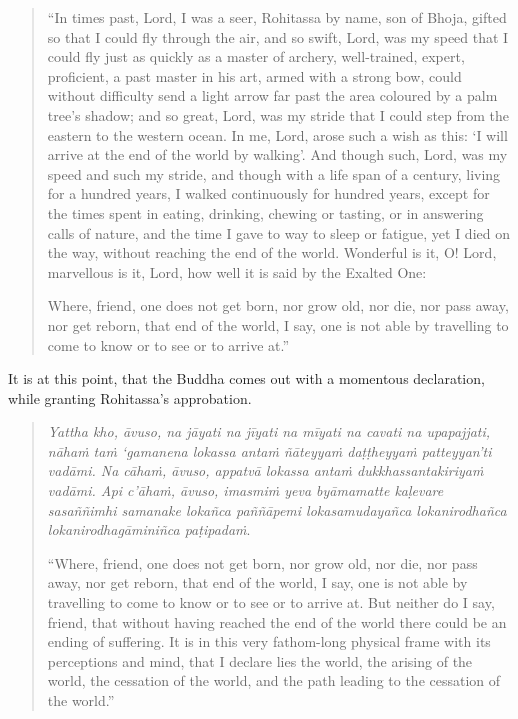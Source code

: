 \begin{quote}
``In times past, Lord, I was a seer, Rohitassa by name, son of Bhoja, gifted so that I could fly through the air, and so swift, Lord, was my speed that I could fly just as quickly as a master of archery, well-trained, expert, proficient, a past master in his art, armed with a strong bow, could without difficulty send a light arrow far past the area coloured by a palm tree's shadow; and so great, Lord, was my stride that I could step from the eastern to the western ocean. In me, Lord, arose such a wish as this: `I will arrive at the end of the world by walking'. And though such, Lord, was my speed and such my stride, and though with a life span of a century, living for a hundred years, I walked continuously for hundred years, except for the times spent in eating, drinking, chewing or tasting, or in answering calls of nature, and the time I gave to way to sleep or fatigue, yet I died on the way, without reaching the end of the world. Wonderful is it, O! Lord, marvellous is it, Lord, how well it is said by the Exalted One:

Where, friend, one does not get born, nor grow old, nor die, nor pass away, nor get reborn, that end of the world, I say, one is not able by travelling to come to know or to see or to arrive at.''
\end{quote}

It is at this point, that the Buddha comes out with a momentous declaration, while granting Rohitassa's approbation.

\begin{quote}
\emph{Yattha kho, āvuso, na jāyati na jīyati na mīyati na cavati na upapajjati, nāhaṁ taṁ `gamanena lokassa antaṁ ñāteyyaṁ daṭṭheyyaṁ patteyyan'ti vadāmi. Na cāhaṁ, āvuso, appatvā lokassa antaṁ dukkhassantakiriyaṁ vadāmi. Api c'āhaṁ, āvuso, imasmiṁ yeva byāmamatte kaḷevare sasaññimhi samanake lokañca paññāpemi lokasamudayañca lokanirodhañca lokanirodhagāminiñca paṭipadaṁ}.

``Where, friend, one does not get born, nor grow old, nor die, nor pass away, nor get reborn, that end of the world, I say, one is not able by travelling to come to know or to see or to arrive at. But neither do I say, friend, that without having reached the end of the world there could be an ending of suffering. It is in this very fathom-long physical frame with its perceptions and mind, that I declare lies the world, the arising of the world, the cessation of the world, and the path leading to the cessation of the world.''
\end{quote}

